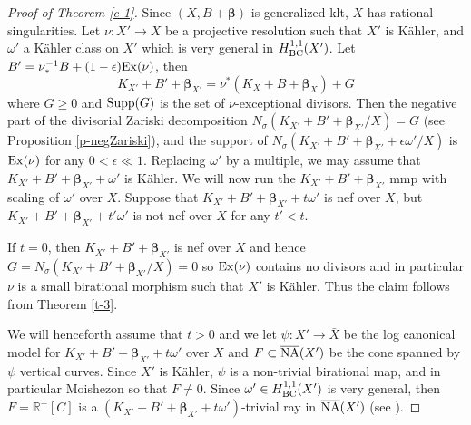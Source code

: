 \documentclass[11pt]{amsart}
\newcommand\Xieinline[1]{\todo[inline,color=green!40]{#1}} %
\numberwithin{equation}{section}
\def\bbeta{\boldsymbol{\beta}}
\newcommand\Q{{\mathbb{Q}}}
\newcommand\R{{\mathbb{R}}}
\theoremstyle{definition}
\theoremstyle{definition}
\theoremstyle{definition}
\begin{document}
\begin{proof}[Proof of Theorem \ref{c-1}]

Since $(X,B+\bbeta)$ is generalized klt, $X$ has rational singularities. Let $\nu :X'\to X$ be a projective resolution such that $X'$ is K\"ahler, and $\omega '$ a K\"ahler class on $X'$ which is very general in $H^{1,1}_{\rm BC}(X')$. Let $B'=\nu ^{-1}_*B+(1-\epsilon){\rm Ex}(\nu)$, then \[K_{X'}+B'+\bbeta _{X'}=\nu^*(K_X+B+\bbeta _X)+G\] where $G\geq 0$ and ${\rm Supp}(G)$ is the set of $\nu$-exceptional divisors. Then the negative part of the divisorial Zariski decomposition  $N_{\sigma}(K_{X'}+B'+\bbeta _{X'}/X)=G$ (see Proposition \ref{p-negZariski}),  and the support of $N_{\sigma}(K_{X'}+B'+\bbeta _{X'}+\epsilon \omega ' /X)$ is  ${\rm Ex}(\nu)$ for any $0<\epsilon \ll 1$. Replacing $\omega '$ by a multiple, we may assume that $K_{X'}+B'+\bbeta _{X'}+ \omega ' $ is K\"ahler. 
 We will now run the $K_{X'}+B'+\bbeta _{X'}$ mmp with scaling of $\omega '$ over $X$.  
 Suppose that $K_{X'}+B'+\bbeta _{X'}+t\omega '$ is nef over $X$, but $K_{X'}+B'+\bbeta _{X'}+t'\omega '$ is not nef over $X$ for any $t'<t$. 
 
 If $t=0$, then $K_{X'}+B'+\bbeta _{X'}$ is nef over $X$ and hence $G=N_{\sigma}(K_{X'}+B'+\bbeta _{X'}/X)=0$ so ${\rm Ex}(\nu)$ contains no divisors and in particular $\nu$ is a small birational morphism such that $X'$ is K\"ahler. %
 Thus the claim follows from Theorem \ref{t-3}.
 
 We will henceforth assume that $t>0$ and we let $\psi :X'\to \bar X$ be the log canonical model for $K_{X'}+B'+\bbeta _{X'}+t\omega '$ over $X$ and  $F\subset \overline{\rm NA}(X')$ be the cone spanned by $\psi$ vertical curves.
  Since $X'$ is K\"ahler, $\psi$ is a non-trivial birational map, and in particular Moishezon so that $F\ne 0$.  Since $\omega '\in H^{1,1}_{\rm BC}(X')$ is very general, then $F=\R^+[C]$ is a $(K_{X'}+B'+\bbeta _{X'}+t\omega ')$-trivial ray in $\overline{\rm NA}(X')$ (see \cite[Lemma 7.1]{DHP24}). 
  

\end{proof}
\end{document}
